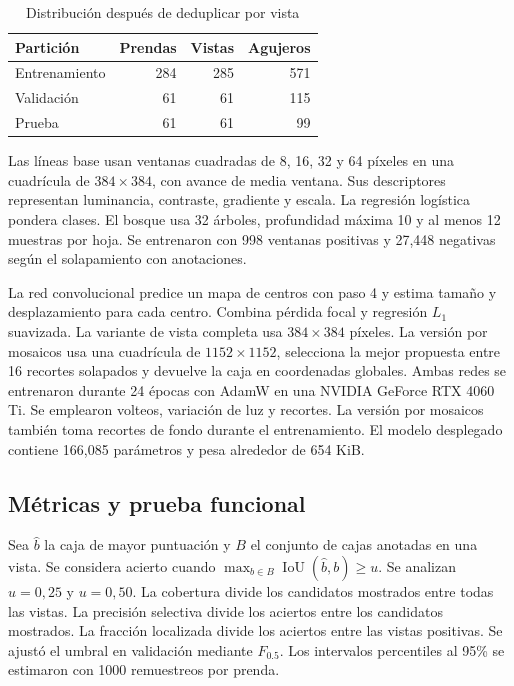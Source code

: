 \documentclass[conference,a4paper]{IEEEtran}
\begin{document}
\begin{table}[!t]
\centering
\caption{Distribución después de deduplicar por vista}
\label{tab:datos}
\begin{tabular}{lrrr}
\toprule
Partición & Prendas & Vistas & Agujeros \\
\midrule
Entrenamiento & 284 & 285 & 571 \\
Validación & 61 & 61 & 115 \\
Prueba & 61 & 61 & 99 \\
\bottomrule
\end{tabular}
\end{table}

Las líneas base usan ventanas cuadradas de 8, 16, 32 y 64 píxeles en una cuadrícula de $384\times384$, con avance de media ventana. Sus descriptores representan luminancia, contraste, gradiente y escala. La regresión logística pondera clases. El bosque usa 32 árboles, profundidad máxima 10 y al menos 12 muestras por hoja. Se entrenaron con 998 ventanas positivas y 27,448 negativas según el solapamiento con anotaciones.

La red convolucional predice un mapa de centros con paso 4 y estima tamaño y desplazamiento para cada centro. Combina pérdida focal y regresión $L_1$ suavizada. La variante de vista completa usa $384\times384$ píxeles. La versión por mosaicos usa una cuadrícula de $1152\times1152$, selecciona la mejor propuesta entre 16 recortes solapados y devuelve la caja en coordenadas globales. Ambas redes se entrenaron durante 24 épocas con AdamW en una NVIDIA GeForce RTX 4060 Ti. Se emplearon volteos, variación de luz y recortes. La versión por mosaicos también toma recortes de fondo durante el entrenamiento. El modelo desplegado contiene 166,085 parámetros y pesa alrededor de 654 KiB.

\subsection{Métricas y prueba funcional}
Sea $\hat b$ la caja de mayor puntuación y $B$ el conjunto de cajas anotadas en una vista. Se considera acierto cuando $\max_{b\in B}\operatorname{IoU}(\hat b,b) \geq u$. Se analizan $u=0{,}25$ y $u=0{,}50$. La cobertura divide los candidatos mostrados entre todas las vistas. La precisión selectiva divide los aciertos entre los candidatos mostrados. La fracción localizada divide los aciertos entre las vistas positivas. Se ajustó el umbral en validación mediante $F_{0.5}$. Los intervalos percentiles al 95\% se estimaron con 1000 remuestreos por prenda.
\end{document}
